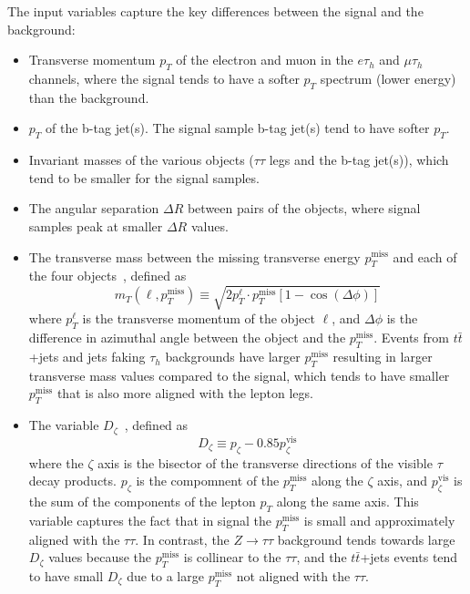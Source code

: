 The input variables capture the key differences between the signal and the background:
\begin{itemize}
    \item Transverse momentum $p_{T}$ of the electron and muon in the $e\tau_{h}$ and $\mu\tau_{h}$ channels, where the signal tends to have a softer $p_{T}$ spectrum (lower energy) than the background.
    \item $p_{T}$ of the b-tag jet(s). The signal sample b-tag jet(s) tend to have softer $p_{T}$.
    \item Invariant masses of the various objects ($\tau\tau$ legs and the b-tag jet(s)), which tend to be smaller for the signal samples.
    \item The angular separation $\Delta R$ between pairs of the objects, where signal samples peak at smaller $\Delta R$ values.
    
    \item The transverse mass between the missing transverse energy $p_{T}^{\text{miss}}$ and each of the four objects~\cite{CMS-HIG-17-024}, defined as
        \begin{equation}
            m_{T}(\ell, p_{T}^{\text{miss}}) \equiv \sqrt{2 p_{T}^{\ell} \cdot p_{T}^{\text{miss}} [1 - \cos(\Delta \phi)]}
        \end{equation}
    where $p_{T}^\ell$ is the transverse momentum of the object $\ell$, and $\Delta \phi$ is the difference in azimuthal angle between the object and the $p_{T}^{\text{miss}}$. Events from $t\bar{t}$+jets and jets faking $\tau_{h}$ backgrounds have larger $p_{T}^{\text{miss}}$ resulting in larger transverse mass values compared to the signal, which tends to have smaller $p_{T}^{\text{miss}}$ that is also more aligned with the lepton legs.

    \item The variable $D_{\zeta}$~\cite{CMS-HIG-17-024}, defined as
        \begin{equation}
            D_{\zeta} \equiv p_{\zeta} - 0.85 p_{\zeta}^{\text{vis}}
        \end{equation}
        where the $\zeta$ axis is the bisector of the transverse directions of the visible $\tau$ decay products. $p_{\zeta}$ is the compomnent of the $p_{T}^{\text{miss}}$ along the $\zeta$ axis, and $p_{\zeta}^{\text{vis}}$ is the sum of the components of the lepton $p_{T}$ along the same axis. This variable captures the fact that in signal the $p_{T}^\text{miss}$ is small and approximately aligned with the $\tau\tau$. In contrast, the $Z \rightarrow \tau\tau$ background tends towards large $D_{\zeta}$ values because the $p_{T}^{\text{miss}}$ is collinear to the $\tau\tau$, and the $t\bar{t}$+jets events tend to have small $D_{\zeta}$ due to a large $p_{T}^{\text{miss}}$ not aligned with the $\tau\tau$.


\end{itemize}
